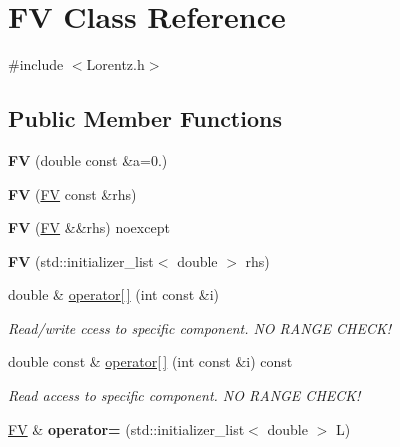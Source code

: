 \hypertarget{classFV}{}\section{F\+V Class Reference}
\label{classFV}


{\ttfamily \#include $<$Lorentz.\+h$>$}

\subsection*{Public Member Functions}
\begin{DoxyCompactItemize}
\item 
\hypertarget{classFV_a9b4fbb099348e0f5658290d99fcfde0f}{}{\bfseries F\+V} (double const \&a=0.)\label{classFV_a9b4fbb099348e0f5658290d99fcfde0f}

\item 
\hypertarget{classFV_a7806dbe1498cda6e7b5e9deb0772915d}{}{\bfseries F\+V} (\hyperlink{classFV}{F\+V} const \&rhs)\label{classFV_a7806dbe1498cda6e7b5e9deb0772915d}

\item 
\hypertarget{classFV_a64d4ea0c4b74dd2fd557c72c30987aa5}{}{\bfseries F\+V} (\hyperlink{classFV}{F\+V} \&\&rhs) noexcept\label{classFV_a64d4ea0c4b74dd2fd557c72c30987aa5}

\item 
\hypertarget{classFV_aae9c72a65282efeadacc1b2be82b8b29}{}{\bfseries F\+V} (std\+::initializer\+\_\+list$<$ double $>$ rhs)\label{classFV_aae9c72a65282efeadacc1b2be82b8b29}

\item 
\hypertarget{classFV_addb4bbcc8d3ba7d8e94c1b6fdd006acd}{}double \& \hyperlink{classFV_addb4bbcc8d3ba7d8e94c1b6fdd006acd}{operator\mbox{[}$\,$\mbox{]}} (int const \&i)\label{classFV_addb4bbcc8d3ba7d8e94c1b6fdd006acd}

\begin{DoxyCompactList}\small\item\em Read/write ccess to specific component. N\+O R\+A\+N\+G\+E C\+H\+E\+C\+K! \end{DoxyCompactList}\item 
\hypertarget{classFV_a8c340629f03c5f4d96aefd119dd43d6e}{}double const \& \hyperlink{classFV_a8c340629f03c5f4d96aefd119dd43d6e}{operator\mbox{[}$\,$\mbox{]}} (int const \&i) const \label{classFV_a8c340629f03c5f4d96aefd119dd43d6e}

\begin{DoxyCompactList}\small\item\em Read access to specific component. N\+O R\+A\+N\+G\+E C\+H\+E\+C\+K! \end{DoxyCompactList}\item 
\hypertarget{classFV_a3ce0839ccafbead03b532cdf4af5d4c1}{}\hyperlink{classFV}{F\+V} \& {\bfseries operator=} (std\+::initializer\+\_\+list$<$ double $>$ L)\label{classFV_a3ce0839ccafbead03b532cdf4af5d4c1}


\end{DoxyCompactItemize}
